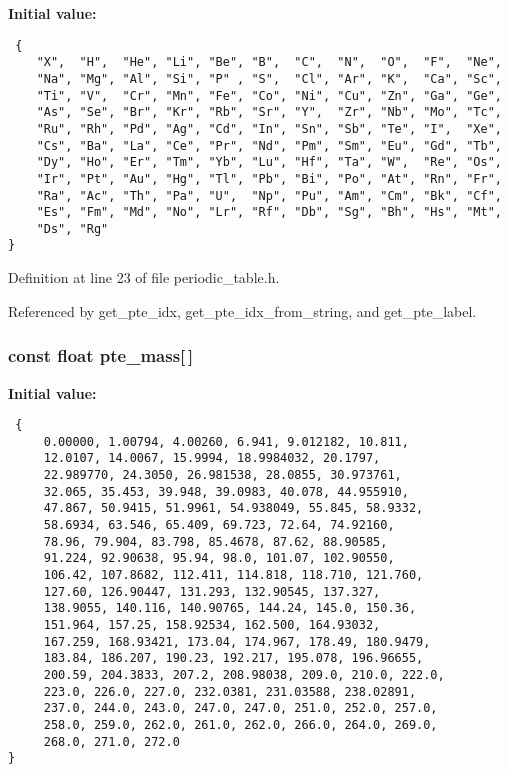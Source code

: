 {\bf Initial value:}

\footnotesize\begin{verbatim} { 
    "X",  "H",  "He", "Li", "Be", "B",  "C",  "N",  "O",  "F",  "Ne",
    "Na", "Mg", "Al", "Si", "P" , "S",  "Cl", "Ar", "K",  "Ca", "Sc",
    "Ti", "V",  "Cr", "Mn", "Fe", "Co", "Ni", "Cu", "Zn", "Ga", "Ge", 
    "As", "Se", "Br", "Kr", "Rb", "Sr", "Y",  "Zr", "Nb", "Mo", "Tc",
    "Ru", "Rh", "Pd", "Ag", "Cd", "In", "Sn", "Sb", "Te", "I",  "Xe",
    "Cs", "Ba", "La", "Ce", "Pr", "Nd", "Pm", "Sm", "Eu", "Gd", "Tb",
    "Dy", "Ho", "Er", "Tm", "Yb", "Lu", "Hf", "Ta", "W",  "Re", "Os",
    "Ir", "Pt", "Au", "Hg", "Tl", "Pb", "Bi", "Po", "At", "Rn", "Fr",
    "Ra", "Ac", "Th", "Pa", "U",  "Np", "Pu", "Am", "Cm", "Bk", "Cf",
    "Es", "Fm", "Md", "No", "Lr", "Rf", "Db", "Sg", "Bh", "Hs", "Mt",
    "Ds", "Rg"
}\end{verbatim}\normalsize 


Definition at line 23 of file periodic\_\-table.h.

Referenced by get\_\-pte\_\-idx, get\_\-pte\_\-idx\_\-from\_\-string, and get\_\-pte\_\-label.
\subsubsection{\setlength{\rightskip}{0pt plus 5cm}const float pte\_\-mass[$\,$]\hspace{0.3cm}{\tt  [static]}}\label{periodic__table_8h_a2}


{\bf Initial value:}

\footnotesize\begin{verbatim} { 
     0.00000, 1.00794, 4.00260, 6.941, 9.012182, 10.811,  
     12.0107, 14.0067, 15.9994, 18.9984032, 20.1797, 
     22.989770, 24.3050, 26.981538, 28.0855, 30.973761,
     32.065, 35.453, 39.948, 39.0983, 40.078, 44.955910,
     47.867, 50.9415, 51.9961, 54.938049, 55.845, 58.9332,
     58.6934, 63.546, 65.409, 69.723, 72.64, 74.92160, 
     78.96, 79.904, 83.798, 85.4678, 87.62, 88.90585, 
     91.224, 92.90638, 95.94, 98.0, 101.07, 102.90550,
     106.42, 107.8682, 112.411, 114.818, 118.710, 121.760, 
     127.60, 126.90447, 131.293, 132.90545, 137.327, 
     138.9055, 140.116, 140.90765, 144.24, 145.0, 150.36,
     151.964, 157.25, 158.92534, 162.500, 164.93032, 
     167.259, 168.93421, 173.04, 174.967, 178.49, 180.9479,
     183.84, 186.207, 190.23, 192.217, 195.078, 196.96655, 
     200.59, 204.3833, 207.2, 208.98038, 209.0, 210.0, 222.0, 
     223.0, 226.0, 227.0, 232.0381, 231.03588, 238.02891,
     237.0, 244.0, 243.0, 247.0, 247.0, 251.0, 252.0, 257.0,
     258.0, 259.0, 262.0, 261.0, 262.0, 266.0, 264.0, 269.0,
     268.0, 271.0, 272.0
}\end{verbatim}\normalsize 


